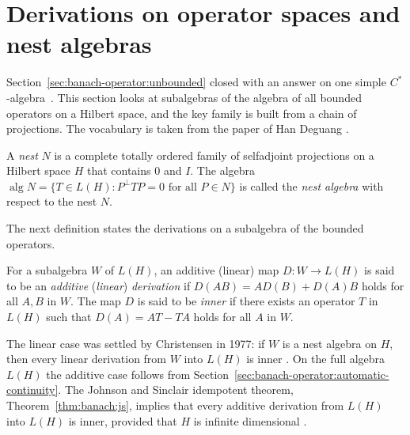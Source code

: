 \section{Derivations on operator spaces and nest algebras}\label{sec:banach-operator:operator-derivations}

Section~\ref{sec:banach-operator:unbounded} closed with an answer on one
simple $C^*$-algebra~\cite[p.~1165]{HanDeguang1993Nest}. This section looks at subalgebras of the algebra of
all bounded operators on a Hilbert space, and the key family is built from
a chain of projections. The vocabulary is taken from the paper of Han Deguang
\cite[p.~1165]{HanDeguang1993Nest}.

\begin{definition}\label{def:banach:nest}
A \emph{nest} $N$ is a complete totally ordered family of selfadjoint
projections on a Hilbert space $H$ that contains $0$ and $I$. The algebra
$\operatorname{alg}N=\{T\in L(H):P^{\perp}TP=0\text{ for all }P\in N\}$ is
called the \emph{nest algebra} with respect to the nest $N$.
\end{definition}

The next definition states the derivations on a subalgebra of the bounded
operators.

\begin{definition}\label{def:banach:additiveder}
For a subalgebra $W$ of $L(H)$, an additive (linear) map
$D:W\rightarrow L(H)$ is said to be an \emph{additive} (\emph{linear})
\emph{derivation} if $D(AB)=AD(B)+D(A)B$ holds for all $A,B$ in $W$. The
map $D$ is said to be \emph{inner} if there exists an operator $T$ in
$L(H)$ such that $D(A)=AT-TA$ holds for all $A$ in $W$.
\end{definition}

The linear case was settled by Christensen in 1977: if $W$ is a nest algebra
on $H$, then every linear derivation from $W$ into $L(H)$ is inner
\cite[p.~1165]{HanDeguang1993Nest}. On the full algebra $L(H)$ the additive
case follows from Section~\ref{sec:banach-operator:automatic-continuity}. The
Johnson and Sinclair idempotent theorem, Theorem~\ref{thm:banach:js}, implies
that every additive derivation from $L(H)$ into $L(H)$ is inner, provided that
$H$ is infinite dimensional \cite[p.~1165]{HanDeguang1993Nest}.

